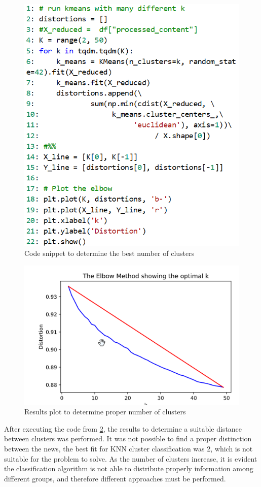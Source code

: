 \begin{figure}[H]
   \centering
   \includegraphics[width=\linewidth]{fig/TextAnalysisDistorions.png}
    \caption{Code snippet to determine the best number of clusters}
    \label{fig:TextAnalysisDistorions}
\end{figure}

\begin{figure}[H]
   \centering
   \includegraphics[width=\linewidth]{fig/DistorionChart.png}
    \caption{Results plot to determine proper number of clusters}
    \label{fig:DistorionChart}
\end{figure}


After executing the code from \ref{fig:DistorionChart}, the results to determine a suitable distance between clusters was performed. It was not possible to find a proper distinction between the news, the best fit for KNN cluster classification was 2, which is not suitable for the problem to solve. As the number of clusters increase, it is evident the classification algorithm is not able to distribute properly information among different groups, and therefore different approaches must be performed.

